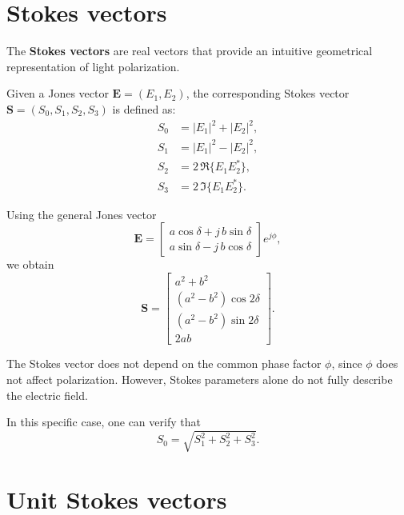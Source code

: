 \section{Stokes vectors}

The \textbf{Stokes vectors} are real vectors that provide an intuitive geometrical representation of light polarization.

Given a Jones vector $\mathbf{E} = (E_1, E_2)$,  
the corresponding Stokes vector $\mathbf{S} = (S_0, S_1, S_2, S_3)$ is defined as:
\begin{align}
    S_0 &= |E_1|^2 + |E_2|^2,\\
    S_1 &= |E_1|^2 - |E_2|^2,\\
    S_2 &= 2\,\Re\{E_1 E_2^*\},\\
    S_3 &= 2\,\Im\{E_1 E_2^*\}.
\end{align}

Using the general Jones vector
\[
\mathbf{E} =
\begin{bmatrix}
    a\cos\delta + j\,b\sin\delta\\
    a\sin\delta - j\,b\cos\delta
\end{bmatrix} e^{j\phi},
\]
we obtain
\begin{equation}
    \mathbf{S} =
    \begin{bmatrix}
        a^2 + b^2\\
        (a^2 - b^2)\cos 2\delta\\
        (a^2 - b^2)\sin 2\delta\\
        2ab
    \end{bmatrix}.
\end{equation}

\medskip
The Stokes vector does not depend on the common phase factor $\phi$, since $\phi$ does not affect polarization.  
However, Stokes parameters alone do not fully describe the electric field.

\medskip
In this specific case, one can verify that
\begin{equation}
    S_0 = \sqrt{S_1^2 + S_2^2 + S_3^2}.
\end{equation}



\section{Unit Stokes vectors}

